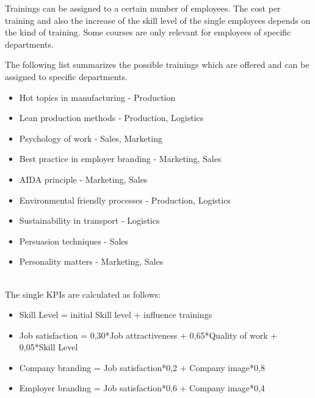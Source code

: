 Trainings can be assigned to a certain number of employees. The cost per training and also the increase of the skill level of the single employees depends on the kind of training. Some courses are only relevant for employees of specific departments.

The following list summarizes the possible trainings which are offered and can be assigned to specific departments.
\begin{itemize}
\item Hot topics in manufacturing - Production
\item Lean production methods - Production, Logistics
\item Psychology of work - Sales, Marketing
\item Best practice in employer branding - Marketing, Sales
\item AIDA principle - Marketing, Sales
\item Environmental friendly processes - Production, Logistics
\item Sustainability in transport - Logistics
\item Persuasion techniques - Sales
\item Personality matters - Marketing, Sales
\end{itemize}
\ \\
The single KPIs are calculated as follows: 
\begin{itemize}
\item Skill Level = initial Skill level + influence trainings
\item Job satisfaction = 0,30*Job attractiveness + 0,65*Quality of work + 0,05*Skill Level
\item Company branding = Job satisfaction*0,2 + Company image*0,8 
\item Employer branding = Job satisfaction*0,6 + Company image*0,4 
\end{itemize}